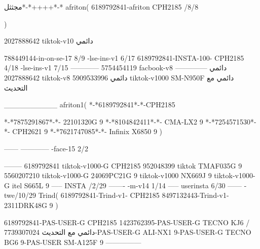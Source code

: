 مجثثل*-*++++*-*
afriton(
6189792841-afriton CPH2185  /8/8

)

2027888642 tiktok-v10
دائمي

788449144-in-on-se-17 8/9
-lse-ins-v1 6/17
6189792841-INSTA-100- CPH2185 4/18
-lse-ins-v1 7/15
------------
5754454119 facbook-v8
دائمي
--------------
2027888642 tiktok-v8
دائمي
5909533996 tiktok-v1000  SM-N950F
دائمي مع التحديث

__________
afriton1(
*-*6189792841*-*-CPH2185

*-*7875291867*-*- 22101320G   9\2
*-*8104842411*-*- CMA-LX2   9\4
*-*7254571530*-*- CPH2621   9\6
*-*7621747085*-*- Infinix X6850   9\6
)


------
------------
-face-15 2/2

--------
6189792841 tiktok-v1000-G CPH2185 
952048399 tiktok TMAF035G 9
5560207210 tiktok-v1000-G 24069PC21G  9 tiktok-v1000 NX669J  9 tiktok-v1000-G  itel S665L  9\3
-----
 INSTA /2/29
-------
-m-v14 1/14
-----
userinsta 6/30
------
-twe/10/29
Trind(
6189792841-Trind-v1- CPH2185 
8497132443-Trind-v1- 2311DRK48G  9\5
)


6189792841-PAS-USER-G CPH2185 
1423762395-PAS-USER-G TECNO KJ6  /دائمي مع التحديث
7739307024-PAS-USER-G  ALI-NX1  9-PAS-USER-G  TECNO BG6  9-PAS-USER  SM-A125F  9\8
    ---------------
